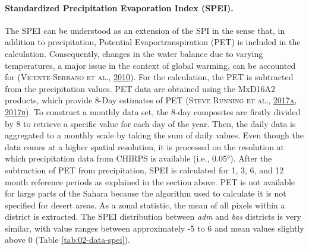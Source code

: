 \documentclass[a4paper,11pt]{article}
\begin{document}
\hypertarget{standardized-precipitation-evaporation-index-spei.}{%
\paragraph{Standardized Precipitation Evaporation Index (SPEI).}\label{standardized-precipitation-evaporation-index-spei.}}

The SPEI can be understood as an extension of the SPI in the sense that,
in addition to precipitation, Potential Evaportranspiration (PET) is included in
the calculation. Consequently, changes in the water balance due to varying
temperatures, a major issue in the context of global warming, can be accounted for
\textsc{(\textnormal{\textsc{Vicente-Serrano} \textsc{et al.}}, \textnormal{\protect\hyperlink{ref-vicente2010}{2010}})}. For the calculation, the PET is subtracted from the
precipitation values. PET data are obtained using the MxD16A2 products,
which provide 8-Day estimates of PET \textsc{(\textnormal{\textsc{Steve Running} \textsc{et al.}}, \textnormal{\protect\hyperlink{ref-runningsteve2017}{2017}\protect\hyperlink{ref-runningsteve2017}{a}}, \protect\hyperlink{ref-runningsteve2017a}{2017}\protect\hyperlink{ref-runningsteve2017a}{b})}. To
construct a monthly data set, the 8-day composites are firstly divided by 8 to
retrieve a specific value for each day of the year. Then, the daily data is
aggregated to a monthly scale by taking
the sum of daily values. Even though the data comes at a higher spatial resolution,
it is processed on the resolution at which precipitation data from CHIRPS
is available (i.e., 0.05°). After the subtraction of PET from precipitation,
SPEI is calculated for 1, 3, 6, and 12 month reference periods as explained in
the section above. PET is not available for large parts of the Sahara
because the algorithm used to calculate it is not specified for desert areas.
As a zonal statistic, the mean of all pixels within a district is extracted.
The SPEI distribution between \emph{adm} and \emph{bas} districts is very similar, with
value ranges between approximately -5 to 6 and mean values slightly above 0
(Table \ref{tab:02-data-spei}).
\end{document}
